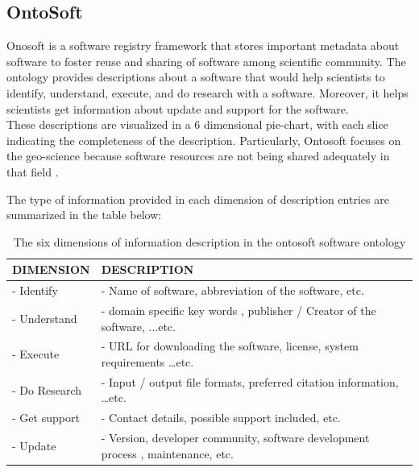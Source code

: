 \subsection{OntoSoft}
\label{subsec:purpose:ontologies:OntoSoft}
Onosoft is a software registry framework that stores important metadata about software to foster reuse and sharing of software among scientific community. The ontology provides descriptions about a software that would help scientists to identify, understand, execute, and do research with a software. Moreover, it helps scientists get information about update and support for the software. \\

These descriptions are visualized in a 6 dimensional pie-chart, with each slice indicating the completeness of the description. Particularly, Ontosoft focuses on the geo-science because software resources are not being shared adequately in that field \citep{gil2015ontosoft}.

The type of information provided in each dimension of description entries are  summarized in the table below:



\begin{table}[h!]
	\begin{center}
		\caption{The six dimensions of information description in the ontosoft software ontology}
		\label{tab:table34:ontosoft}
		\begin{tabular}{|l|l|} %
			
			\hline
			 DIMENSION   & DESCRIPTION  \\
			 \hline
			- Identify   & - Name of software, abbreviation of the software, etc.  \\
			 \hline
			- Understand & -  domain specific key words , publisher / Creator of the software, ...etc.\\
			 \hline
			- Execute    & -	URL for downloading the software, license, system requirements …etc.  \\
			 \hline
			- Do Research & -	Input / output file formats, preferred citation information, …etc.   \\
			 \hline
			- Get support & -	Contact details, possible support included, etc.  \\
			 \hline
			- Update      & - Version, developer community, software development process , maintenance, etc.  \\
			\hline
		\end{tabular}
	\end{center}
\end{table}

